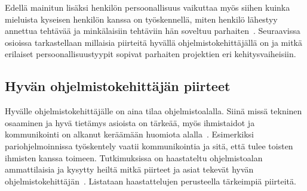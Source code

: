 \documentclass[finnish]{../tktltiki2}
\theoremstyle{definition}
\theoremstyle{remark}
\begin{document}
Edellä mainitun lisäksi henkilön persoonallisuus vaikuttaa myös
siihen
kuinka mieluista kyseisen henkilön kanssa on työskennellä,
miten henkilö lähestyy annettua tehtävää ja minkälaisiin tehtäviin
hän soveltuu parhaiten~\cite{Begel:2008:PPW:1414004.1414026,Capretz:2010:MSS:1726559.1726574}.
Seuraavissa osioissa tarkastellaan millaisia piirteitä hyvällä
ohjelmistokehittäjällä on ja mitkä erilaiset persoonallisuustyypit
sopivat parhaiten projektien eri kehitysvaiheisiin.

\subsection{Hyvän ohjelmistokehittäjän piirteet}

Hyvälle ohjelmistokehittäjälle on aina tilaa ohjelmistoalalla.
Siinä missä tekninen osaaminen ja hyvä tietämys asioista on
tärkeää, myös ihmistaidot ja kommunikointi on alkanut keräämään
huomiota alalla~\cite{Hall:2007:CNT:1235000.1235043}. Esimerkiksi
pariohjelmoinnissa työskentely vaatii kommunikointia ja sitä, että
tulee toisten ihmisten kanssa toimeen.
Tutkimuksissa
on haastateltu ohjelmistoalan ammattilaisia ja kysytty heiltä mitkä
piirteet ja asiat tekevät hyvän ohjelmistokehittäjän~\cite{Acuna:2008:ESP:1414004.1414056,Begel:2008:PPW:1414004.1414026,Hall:2007:CNT:1235000.1235043}. Listataan haastattelujen perusteella tärkeimpiä
piirteitä.
\end{document}
